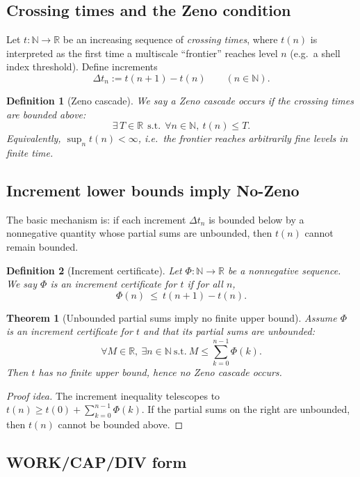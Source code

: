 \documentclass[11pt]{article}
\newcommand{\R}{\mathbb{R}}
\newcommand{\N}{\mathbb{N}}
\newtheorem{theorem}{Theorem}
\newtheorem{definition}{Definition}
\begin{document}
\subsection{Crossing times and the Zeno condition}

Let $t:\N\to\R$ be an increasing sequence of \emph{crossing times}, where $t(n)$ is interpreted as
the first time a multiscale ``frontier'' reaches level $n$ (e.g.\ a shell index threshold).
Define increments
\[
\Delta t_n := t(n+1)-t(n)\qquad (n\in\N).
\]

\begin{definition}[Zeno cascade]\label{def:zeno}
We say a \emph{Zeno cascade} occurs if the crossing times are bounded above:
\[
\exists\,T\in\R\ \ \text{s.t.}\ \ \forall n\in\N,\ t(n)\le T.
\]
Equivalently, $\sup_n t(n)<\infty$, i.e.\ the frontier reaches arbitrarily fine levels in finite time.
\end{definition}

\subsection{Increment lower bounds imply No-Zeno}

The basic mechanism is: if each increment $\Delta t_n$ is bounded below by a nonnegative
quantity whose partial sums are unbounded, then $t(n)$ cannot remain bounded.

\begin{definition}[Increment certificate]\label{def:phi}
Let $\Phi:\N\to\R$ be a nonnegative sequence. We say $\Phi$ is an \emph{increment certificate}
for $t$ if for all $n$,
\[
\Phi(n)\ \le\ t(n+1)-t(n).
\]
\end{definition}

\begin{theorem}[Unbounded partial sums imply no finite upper bound]\label{thm:unbounded-sums-no-zeno}
Assume $\Phi$ is an increment certificate for $t$ and that its partial sums are unbounded:
\[
\forall M\in\R,\ \exists n\in\N\ \text{s.t.}\ M \le \sum_{k=0}^{n-1}\Phi(k).
\]
Then $t$ has no finite upper bound, hence no Zeno cascade occurs.
\end{theorem}

\begin{proof}[Proof idea]
The increment inequality telescopes to
$t(n)\ge t(0)+\sum_{k=0}^{n-1}\Phi(k)$.
If the partial sums on the right are unbounded, then $t(n)$ cannot be bounded above.
\end{proof}

\subsection{WORK/CAP/DIV form}
\end{document}
